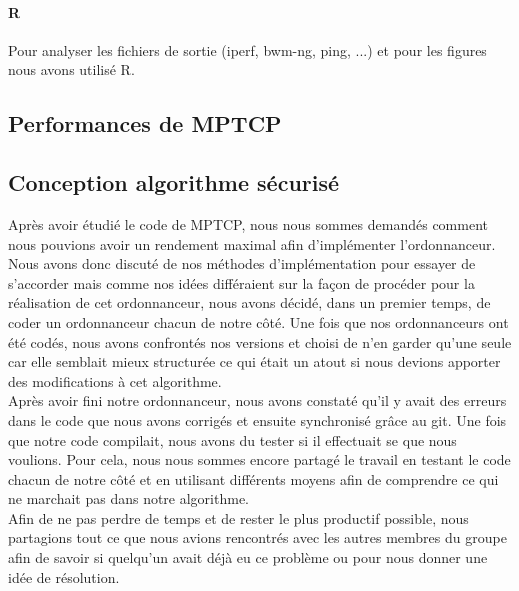 \paragraph{R}
Pour analyser les fichiers de sortie (iperf, bwm-ng, ping, ...) et
pour les figures nous avons utilisé R.



\subsection{Performances de MPTCP}
\label{sec:conce:perfMPTCP}



\subsection{Conception algorithme sécurisé}
\label{sec:conc:algosec}

Après avoir étudié le code de MPTCP, nous nous sommes demandés comment
nous pouvions avoir un rendement maximal afin d'implémenter
l'ordonnanceur. Nous avons donc discuté de nos méthodes
d'implémentation pour essayer de s'accorder mais comme nos idées
différaient sur la façon de procéder pour la réalisation de cet
ordonnanceur, nous avons décidé, dans un premier temps, de coder un
ordonnanceur chacun de notre côté. Une fois que nos ordonnanceurs ont
été codés, nous avons confrontés nos versions et choisi de n'en garder
qu'une seule car elle semblait mieux structurée ce qui était un atout
si nous devions apporter des modifications à cet algorithme.
\\

Après avoir fini notre ordonnanceur, nous avons constaté qu'il y avait
des erreurs dans le code que nous avons corrigés et ensuite
synchronisé grâce au git.  Une fois que notre code compilait, nous
avons du tester si il effectuait se que nous voulions. Pour cela, nous
nous sommes encore partagé le travail en testant le code chacun de
notre côté et en utilisant différents moyens afin de comprendre ce qui
ne marchait pas dans notre algorithme.
\\
Afin de ne pas perdre de temps et de rester le plus productif
possible, nous partagions tout ce que nous avions rencontrés avec les
autres membres du groupe afin de savoir si quelqu'un avait déjà eu ce
problème ou pour nous donner une idée de résolution.
